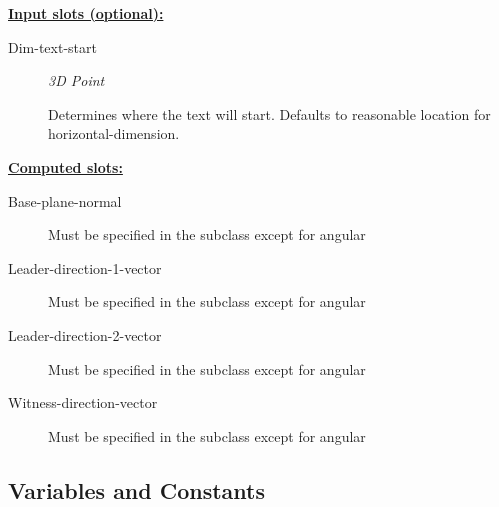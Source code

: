\documentclass [11pt]{book}
\begin{document}
\begin{itemize}
\textbf{
\underline{Input slots (optional):}}

\begin{description}

\item [Dim-text-start]
\emph{3D Point}

 Determines where the text will start. Defaults to reasonable location for
horizontal-dimension.




\end{description}






\textbf{
\underline{Computed slots:}}

\begin{description}

\item [Base-plane-normal]

Must be specified in the subclass except for angular




\item [Leader-direction-1-vector]

Must be specified in the subclass except for angular




\item [Leader-direction-2-vector]

Must be specified in the subclass except for angular




\item [Witness-direction-vector]

Must be specified in the subclass except for angular




\end{description}







\end{itemize}



\subsection{Variables and Constants}
\end{document}
